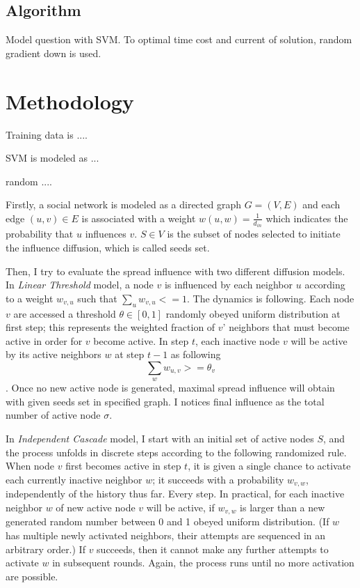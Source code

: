 \documentclass[conference,compsoc]{IEEEtran}
\begin{document}
\subsection{Algorithm}
Model question with SVM. To optimal time cost and current of solution, random
gradient down is used.

\section{Methodology}
Training data is ....

SVM is modeled as ...

random ....

Firstly, a social network is modeled as a directed graph $G=(V,E)$ and each
edge $(u,v)\in E$ is associated with a weight $w(u,w)=\frac{1}{d_{in}}$ which
indicates the probability that $u$ influences $v$. $S\in V$ is the subset of
nodes selected to initiate the influence diffusion,  which is called seeds set.

Then, I try to evaluate the spread influence with two different diffusion
models. In \textit{Linear Threshold} model, a node $v$ is influenced by each
neighbor $u$ according to a weight $w_{v,u}$ such that $\sum_{u}{w_{v,u}}
<=1$. The dynamics is following. Each node $v$ are accessed a threshold $\theta\in
[0,1]$ randomly obeyed uniform distribution at first step; this represents
the weighted fraction of $v$' neighbors that must become active in order
for $v$ become active. In step $t$, each inactive node $v$ will be active
by its active neighbors $w$ at step $t-1$ as following
$$\sum_{w}{w_{u,v}} >= \theta_v$$. Once no new active node is generated,
maximal spread influence will obtain with given seeds set in specified graph.
I notices final influence as the total number of active node $\sigma$.

In \textit{Independent Cascade} model, I start with an initial set of active
nodes $S$, and the process unfolds in discrete steps according to the following
randomized rule. When node $v$ first becomes active in step $t$, it is given
a single chance to activate each currently inactive neighbor $w$; it succeeds
with a probability $w_{v,w}$, independently of the history thus far. Every
step. In practical, for each inactive neighbor $w$ of new active node $v$ will
be active, if $w_{v,w}$ is larger than a new generated random number between 0 and
1 obeyed uniform distribution. (If $w$ has multiple newly activated neighbors,
their attempts are sequenced in an arbitrary order.) If $v$ succeeds, then it
cannot make any further attempts to activate $w$ in subsequent rounds. Again,
the process runs until no more activation are possible.
\end{document}
